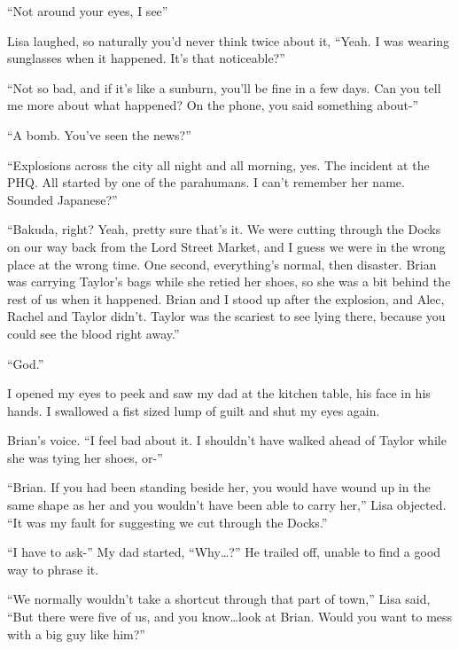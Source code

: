 ``Not around your eyes, I see''



Lisa laughed, so naturally you'd never think twice about it, ``Yeah.  I was wearing sunglasses when it happened.  It's that noticeable?''



``Not so bad, and if it's like a sunburn, you'll be fine in a few days.  Can you tell me more about what happened?  On the phone, you said something about-''



``A bomb.  You've seen the news?''



``Explosions across the city all night and all morning, yes.  The incident at the PHQ.   All started by one of the parahumans.  I can't remember her name.  Sounded Japanese?''



``Bakuda, right?  Yeah, pretty sure that's it.  We were cutting through the Docks on our way back from the Lord Street Market, and I guess we were in the wrong place at the wrong time.  One second, everything's normal, then disaster.  Brian was carrying Taylor's bags while she retied her shoes, so she was a bit behind the rest of us when it happened.  Brian and I stood up after the explosion, and Alec, Rachel and Taylor didn't.  Taylor was the scariest to see lying there, because you could see the blood right away.''



``God.''



I opened my eyes to peek and saw my dad at the kitchen table, his face in his hands.  I swallowed a fist sized lump of guilt and shut my eyes again.



Brian's voice.  ``I feel bad about it.  I shouldn't have walked ahead of Taylor while she was tying her shoes, or-''



``Brian.  If you had been standing beside her, you would have wound up in the same shape as her and you wouldn't have been able to carry her,'' Lisa objected. ``It was my fault for suggesting we cut through the Docks.''



``I have to ask-'' My dad started, ``Why\ldots?''  He trailed off, unable to find a good way to phrase it.



``We normally wouldn't take a shortcut through that part of town,'' Lisa said, ``But there were five of us, and you know\ldots look at Brian.  Would you want to mess with a big guy like him?''



